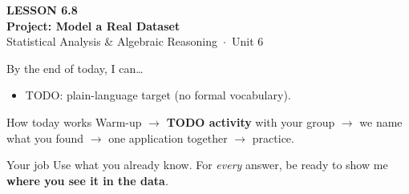 \documentclass[aspectratio=169, 11pt]{beamer}
\begin{document}
{
\begin{frame}[plain]
  \vspace{2.8cm}\hspace{0.55cm}%
  \begin{minipage}{0.9\textwidth}
    {\color{goldacc}\bfseries\small LESSON 6.8}\\[0.5cm]
    {\color{white}\bfseries\LARGE Project: Model a Real Dataset}\\[1.2cm]
    {\color{frostmid}\small Statistical Analysis \& Algebraic Reasoning~$\cdot$~Unit 6}
  \end{minipage}
\end{frame}
}

\newcommand{\redink}[1]{{\color{redacc}\bfseries #1}}

\begin{frame}[t, plain]
  By the end of today, I can\ldots
  \begin{itemize}\setlength{\itemsep}{6pt}
    \item TODO: plain-language target (no formal vocabulary).
  \end{itemize}
  \begin{block}{How today works}
    Warm-up $\to$ \textbf{TODO activity} with your group $\to$ we name what you found $\to$
    one application together $\to$ practice.
  \end{block}
\end{frame}

\begin{frame}[t, plain]
\end{frame}

\begin{frame}[t, plain]
  \begin{block}{Your job}
    Use what you already know. For \emph{every} answer, be ready to show me
    \textbf{where you see it in the data}.
  \end{block}
\end{frame}
\end{document}
